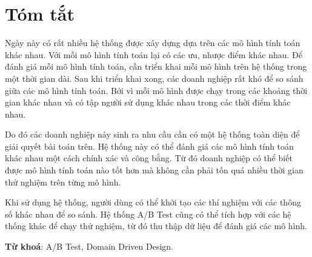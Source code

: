 \chapter*{Tóm tắt}

Ngày này có rất nhiều hệ thống được xây dựng dựa trên các mô hình tính toán khác nhau.
Với mỗi mô hình tính toán lại có các ưu, nhược điểm khác nhau.
Để đánh giá mỗi mô hình tính toán, cần triển khai mỗi mô hình trên hệ thống trong một thời gian dài.
Sau khi triển khai xong, các doanh nghiệp rất khó để so sánh giữa các mô hình tính toán.
Bởi vì mỗi mô hình được chạy trong các khoảng thời gian khác nhau và có tập người sử dụng khác nhau trong các thời điểm
khác nhau.

Do đó các doanh nghiệp nảy sinh ra nhu cầu cần có một hệ thống toàn diện để giải quyết bài toán trên.
Hệ thống này có thể đánh giá các mô hình tính toán khác nhau một cách chính xác và công bằng.
Từ đó doanh nghiệp có thể biết được mô hình tính toán nào tốt hơn mà không cần phải tốn quá nhiều
thời gian thử nghiệm trên từng mô hình.

Khi sử dụng hệ thống, người dùng có thể khởi tạo các thí nghiệm với các thông số khác nhau để so sánh. Hệ thống A/B Test cũng
có thể tích hợp với các hệ thống khác để chạy thử nghiệm, từ đó thu thập dữ liệu để đánh giá các mô hình.

\textbf{Từ khoá}: A/B Test, Domain Driven Design.
